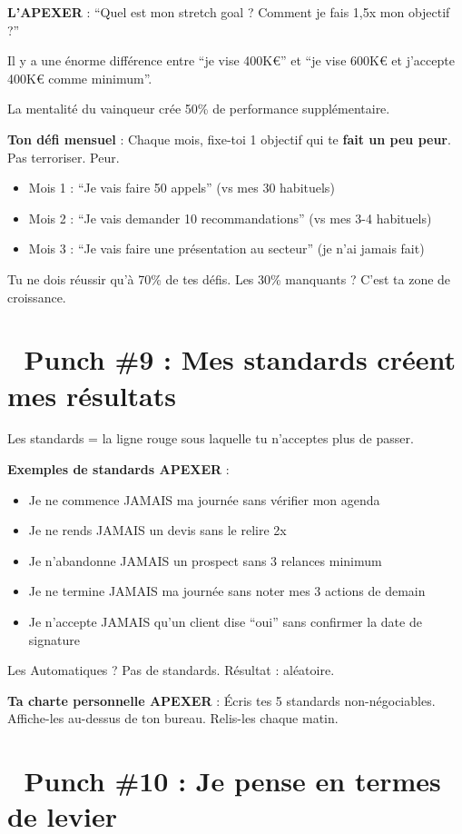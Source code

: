 \documentclass[12pt,a4paper,openany]{book}
\begin{document}
\textbf{L'APEXER} : ``Quel est mon stretch goal ? Comment je fais 1,5x mon objectif ?''

Il y a une énorme différence entre ``je vise 400K\euro{}'' et ``je vise 600K\euro{} et j'accepte 400K\euro{} comme minimum''.

La mentalité du vainqueur crée 50\% de performance supplémentaire.

\textbf{Ton défi mensuel} : Chaque mois, fixe-toi 1 objectif qui te \textbf{fait un peu peur}. Pas terroriser. Peur.

\begin{itemize}
\item Mois 1 : ``Je vais faire 50 appels'' (vs mes 30 habituels)
\item Mois 2 : ``Je vais demander 10 recommandations'' (vs mes 3-4 habituels)
\item Mois 3 : ``Je vais faire une présentation au secteur'' (je n'ai jamais fait)
\end{itemize}

Tu ne dois réussir qu'à 70\% de tes défis. Les 30\% manquants ? C'est ta zone de croissance.

\section*{🥊 Punch \#9 : Mes standards créent mes résultats}

Les standards = la ligne rouge sous laquelle tu n'acceptes plus de passer.

\textbf{Exemples de standards APEXER} :
\begin{itemize}
\item Je ne commence JAMAIS ma journée sans vérifier mon agenda
\item Je ne rends JAMAIS un devis sans le relire 2x
\item Je n'abandonne JAMAIS un prospect sans 3 relances minimum
\item Je ne termine JAMAIS ma journée sans noter mes 3 actions de demain
\item Je n'accepte JAMAIS qu'un client dise ``oui'' sans confirmer la date de signature
\end{itemize}

Les Automatiques ? Pas de standards. Résultat : aléatoire.

\textbf{Ta charte personnelle APEXER} :
Écris tes 5 standards non-négociables. Affiche-les au-dessus de ton bureau. Relis-les chaque matin.

\section*{🥊 Punch \#10 : Je pense en termes de levier}
\end{document}
